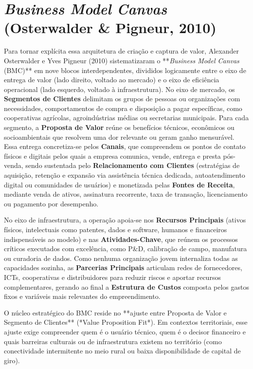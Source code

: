 \section{\textit{Business Model Canvas} (Osterwalder \& Pigneur, 2010)}

Para tornar explícita essa arquitetura de criação e captura de valor, Alexander Osterwalder e Yves Pigneur (2010) sistematizaram o **\textit{Business Model Canvas} (BMC)** em nove blocos interdependentes, divididos logicamente entre o eixo de entrega de valor (lado direito, voltado ao mercado) e o eixo de eficiência operacional (lado esquerdo, voltado à infraestrutura). No eixo de mercado, os \textbf{Segmentos de Clientes} delimitam os grupos de pessoas ou organizações com necessidades, comportamentos de compra e disposição a pagar específicas, como cooperativas agrícolas, agroindústrias médias ou secretarias municipais. Para cada segmento, a \textbf{Proposta de Valor} reúne os benefícios técnicos, econômicos ou socioambientais que resolvem uma dor relevante ou geram ganho mensurável. Essa entrega concretiza-se pelos \textbf{Canais}, que compreendem os pontos de contato físicos e digitais pelos quais a empresa comunica, vende, entrega e presta pós-venda, sendo sustentada pelo \textbf{Relacionamento com Clientes} (estratégias de aquisição, retenção e expansão via assistência técnica dedicada, autoatendimento digital ou comunidades de usuários) e monetizada pelas \textbf{Fontes de Receita}, mediante venda de ativos, assinatura recorrente, taxa de transação, licenciamento ou pagamento por desempenho.

No eixo de infraestrutura, a operação apoia-se nos \textbf{Recursos Principais} (ativos físicos, intelectuais como patentes, dados e software, humanos e financeiros indispensáveis ao modelo) e nas \textbf{Atividades-Chave}, que reúnem os processos críticos executados com excelência, como P\&D, calibração de campo, manufatura ou curadoria de dados. Como nenhuma organização jovem internaliza todas as capacidades sozinha, as \textbf{Parcerias Principais} articulam redes de fornecedores, ICTs, cooperativas e distribuidores para reduzir riscos e aportar recursos complementares, gerando ao final a \textbf{Estrutura de Custos} composta pelos gastos fixos e variáveis mais relevantes do empreendimento.

O núcleo estratégico do BMC reside no **ajuste entre Proposta de Valor e Segmento de Clientes** (*Value Proposition Fit*). Em contextos territoriais, esse ajuste exige compreender quem é o usuário técnico, quem é o decisor financeiro e quais barreiras culturais ou de infraestrutura existem no território (como conectividade intermitente no meio rural ou baixa disponibilidade de capital de giro).

